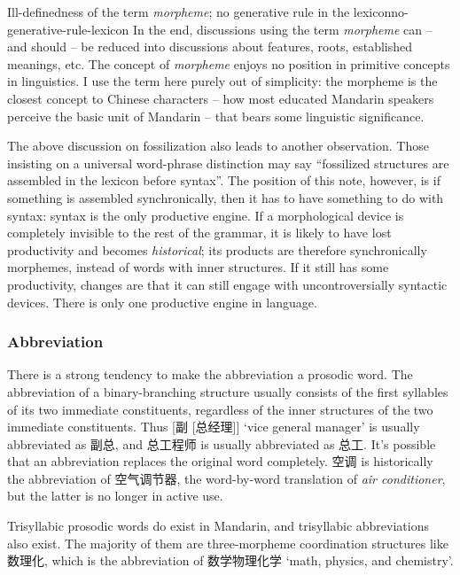 \documentclass[UTF8, a4paper, oneside, scheme=plain]{ctexrep}
\newcommand*{\term}[1]{\emph{#1}}
\newcommand{\corpus}[1]{\emph{#1}}
\newcommand{\translate}[1]{`#1'}
\begin{document}
\begin{theorybox}{Ill-definedness of the term \term{morpheme}; no generative rule in the lexicon}{no-generative-rule-lexicon}
    In the end, discussions using the term \term{morpheme} can -- and should -- 
    be reduced into discussions about features, roots, established meanings, etc.
    The concept of \term{morpheme} enjoys no position 
    in primitive concepts in linguistics.
    I use the term here purely out of simplicity:
    the morpheme is the closest concept to Chinese characters 
    -- how most educated Mandarin speakers perceive the basic unit of Mandarin
    -- that bears some linguistic significance.

    The above discussion on fossilization also leads to another observation.
    Those insisting on a universal word-phrase distinction 
    may say ``fossilized structures are assembled in the lexicon before syntax''.
    The position of this note, however, is if something is assembled synchronically,
    then it has to have something to do with syntax:
    syntax is the only productive engine.
    If a morphological device is completely invisible to the rest of the grammar,
    it is likely to have lost productivity and becomes \emph{historical}; 
    its products are therefore synchronically morphemes, 
    instead of words with inner structures.
    If it still has some productivity,
    changes are that it can still engage with uncontroversially syntactic devices.
    There is only one productive engine in language. 
\end{theorybox}

\subsubsection{Abbreviation}\label{sec:pos.morpheme.abbreviation}

There is a strong tendency to make the abbreviation a prosodic word.
The abbreviation of a binary-branching structure
usually consists of the first syllables of its two immediate constituents,
regardless of the inner structures of the two immediate constituents.
Thus [副 [总经理]] \translate{vice general manager} is usually abbreviated as 副总, 
and 总工程师 is usually abbreviated as 总工.
It's possible that an abbreviation replaces the original word completely.
空调 is historically the abbreviation of 空气调节器, 
the word-by-word translation of \corpus{air conditioner},
but the latter is no longer in active use.

Trisyllabic prosodic words do exist in Mandarin, 
and trisyllabic abbreviations also exist.
The majority of them are three-morpheme coordination structures like 数理化, 
which is the abbreviation of 
数学物理化学 \translate{math, physics, and chemistry}.
\end{document}
